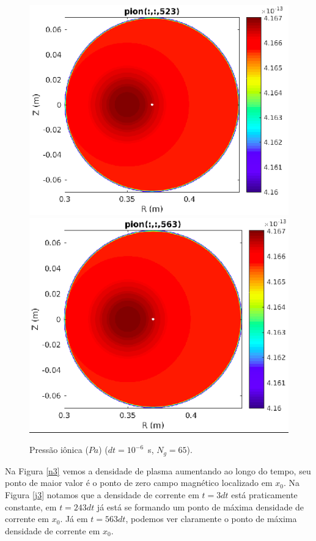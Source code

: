 \documentclass[12pt,oneside,a4paper]{abntex2}
\begin{document}
\begin{figure}[H]
\includegraphics[scale=0.4]{../SImulacao_breakdown/Adaptacao_nova/explicito/i523.png} 
\includegraphics[scale=0.4]{../SImulacao_breakdown/Adaptacao_nova/explicito/i563.png}  
\caption{Pressão iônica ($Pa$) ($dt=10^{-6}$\ s, $N_g = 65$).}
\label{i3}
\end{figure}
 Na Figura \ref{n3} vemos a densidade de plasma aumentando ao longo do tempo, seu ponto de maior valor é o ponto de zero campo magnético localizado em $x_0$.
 Na Figura \ref{j3} notamos que a densidade de corrente em $t=3dt$ está praticamente constante, em $t=243dt$ já está se formando um ponto de máxima densidade de corrente em $x_0$. Já em $t=563dt$, podemos ver claramente o ponto de máxima densidade de corrente em $x_0$.    
\end{document}
